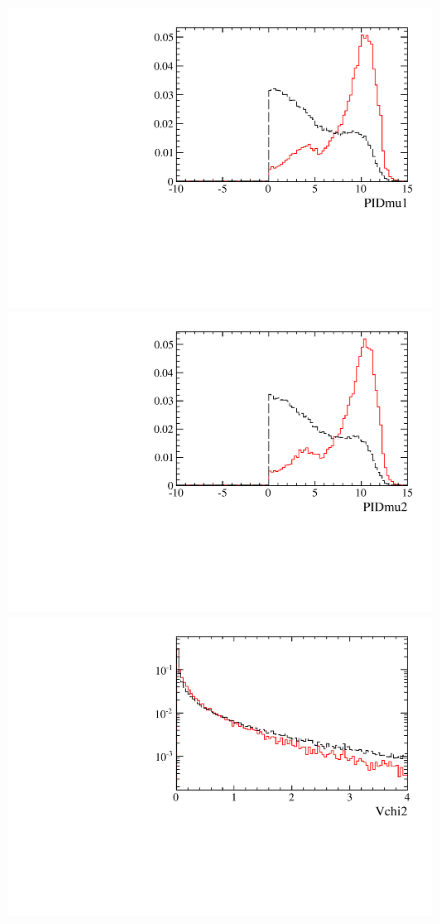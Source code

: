 \begin{figure} [htb!]
\begin{center}
\includegraphics[scale=0.20]{figs/PIDmu1PARTIAL.pdf}
\includegraphics[scale=0.20]{figs/PIDmu2PARTIAL.pdf}
\includegraphics[scale=0.20]{figs/Vchi2PARTIAL.pdf}

\end{center}
\end{figure}
